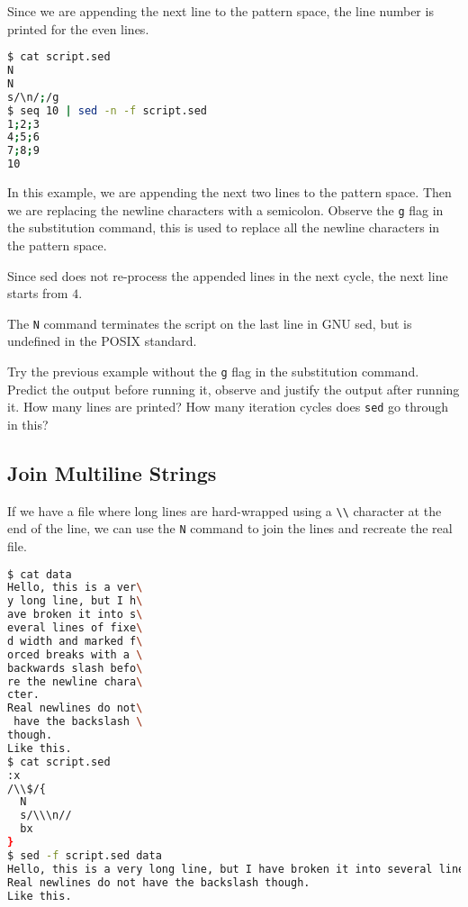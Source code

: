 Since we are appending the next line to the pattern space, the line number is printed for the even lines.

\begin{lstlisting}[language=bash]
$ cat script.sed
N
N
s/\n/;/g
$ seq 10 | sed -n -f script.sed
1;2;3
4;5;6
7;8;9
10
\end{lstlisting}

In this example, we are appending the next two lines to the pattern space.
Then we are replacing the newline characters with a semicolon.
Observe the \lstinline|g| flag in the substitution command, this is used to replace all the newline characters in the pattern space.

Since sed does not re-process the appended lines in the next cycle, the next line starts from $4$.

\begin{remark}
  The \lstinline|N| command terminates the script on the last line in GNU sed, but is undefined in the POSIX standard.
\end{remark}

\begin{exercise}
  Try the previous example without the \lstinline|g| flag in the substitution command. Predict the output before running it, observe and justify the output after running it.
  How many lines are printed?
  How many iteration cycles does \lstinline|sed| go through in this?
\end{exercise}

\subsection{Join Multiline Strings}

If we have a file where long lines are hard-wrapped using a \lstinline|\\| character at the end of the line, we can use the \lstinline|N| command to join the lines and recreate the real file.

\begin{lstlisting}[language=bash]
$ cat data
Hello, this is a ver\
y long line, but I h\
ave broken it into s\
everal lines of fixe\
d width and marked f\
orced breaks with a \
backwards slash befo\
re the newline chara\
cter.
Real newlines do not\
 have the backslash \
though.
Like this.
$ cat script.sed
:x
/\\$/{
  N
  s/\\\n//
  bx
}
$ sed -f script.sed data
Hello, this is a very long line, but I have broken it into several lines of fixed width and marked forced breaks with a backwards slash before the newline character.
Real newlines do not have the backslash though.
Like this.
\end{lstlisting}


